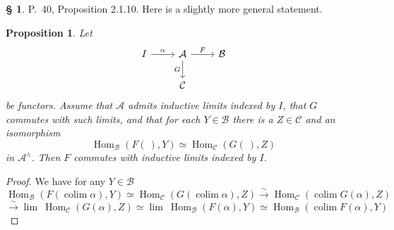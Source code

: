 \documentclass[12pt]{article}%
\newtheorem{prop}[thm]{Proposition}
\theoremstyle{remark}
\theoremstyle{definition}
\newtheorem{s}[thm]{\S}%
\newcommand{\A}{\mathcal A}
\newcommand{\B}{\mathcal B}
\newcommand{\C}{\mathcal C}
\newcommand{\xr}{\xrightarrow}
\DeclareMathOperator*{\colim}{colim}
\DeclareMathOperator{\Hom}{Hom}%
\begin{document}
\begin{s} 
P.~40, Proposition 2.1.10. Here is a slightly more general statement. 
%
\begin{prop}\label{2.1.10}
Let 
$$
\begin{tikzcd}
I\ar{r}{\alpha}&\A\ar{d}[swap]{G}\ar{r}{F}&\B\\
&\C
\end{tikzcd}
$$
be functors. Assume that $\A$ admits inductive limits indexed by $I$, that $G$ commutes with such limits, and that for each $Y\in\B$ there is a $Z\in\C$ and an isomorphism 
$$
\Hom_\B(F(\ ),Y)\simeq\Hom_\C(G(\ ),Z)
$$
in $\A^\wedge$. Then $F$ commutes with inductive limits indexed by $I$.
\end{prop}
%
\begin{proof}
We have for any $Y\in\B$ 
$$ 
\Hom_\B\left(F\left(\colim\alpha\right),Y\right)\simeq
\Hom_\C\left(G\left(\colim\alpha\right),Z\right)
\xr\sim
\Hom_\C\left(\colim G(\alpha),Z\right)
$$
$$
\xr\sim\lim \ \Hom_\C(G(\alpha),Z)\simeq\lim \ \Hom_\B(F(\alpha),Y)\simeq\Hom_\B(\colim F(\alpha),Y)
$$
\end{proof}
\end{s}
%
%
\end{document}
